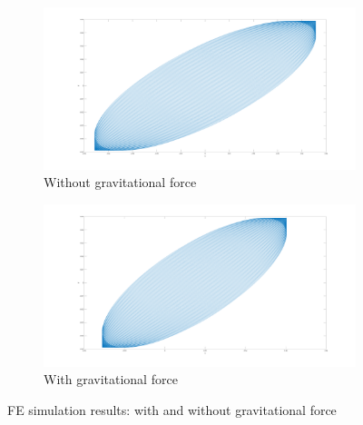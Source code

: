 \documentclass{article}
\begin{document}
\begin{figure}
\centering
    \begin{subfigure}[b]{0.45\textwidth}
        \centering
        \includegraphics[width=\textwidth]{figures/FEA_simu_Orbits_No_grav.png}
        \caption{\small{Without gravitational force}}
        \label{fig:fea:simres_nograp}
    \end{subfigure}
    \begin{subfigure}[b]{0.45\textwidth}
        \centering
        \includegraphics[width=\textwidth]{figures/FEA_simu_Orbits_With_grav.png}
        \caption{\small{With gravitational force}}
        \label{fig:fea:simres_withgrav}
    \end{subfigure}
\caption{FE simulation results: with and without gravitational force}
    \label{fig:fea:simres_gravitational_force_comparison}
\end{figure}
\end{document}
